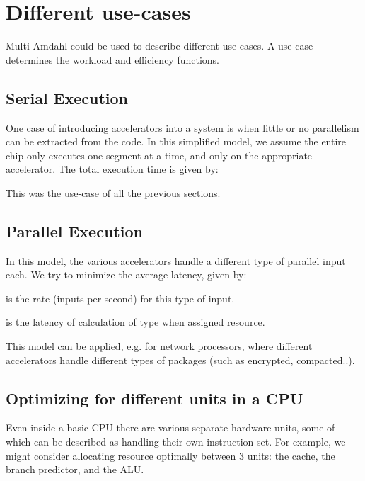 \documentclass[twocolumn,english]{IEEEtran}
\begin{document}
\section{\label{sec:use-case}Different use-cases}

Multi-Amdahl could be used to describe different use cases. A use
case determines the workload and efficiency functions.


\subsection{Serial Execution}

One case of introducing accelerators into a system is when little
or no parallelism can be extracted from the code. In this simplified
model, we assume the entire chip only executes one segment at a time,
and only on the appropriate accelerator. The total execution time
is given by:


This was the use-case of all the previous sections.


\subsection{\label{sub:use-ser}Parallel Execution}



In this model, the various accelerators handle a different type of
parallel input each. We try to minimize the average latency, given
by:




 is the rate (inputs per second) for this type of input.

 is the latency of calculation of type  when assigned
 resource.

This model can be applied, e.g. for network processors, where different
accelerators handle different types of packages (such as encrypted,
compacted..).




\subsection{Optimizing for different units in a CPU}

Even inside a basic CPU there are various separate hardware units,
some of which can be described as handling their own instruction set.
For example, we might consider allocating resource optimally between
3 units: the cache, the branch predictor, and the ALU.
\end{document}

